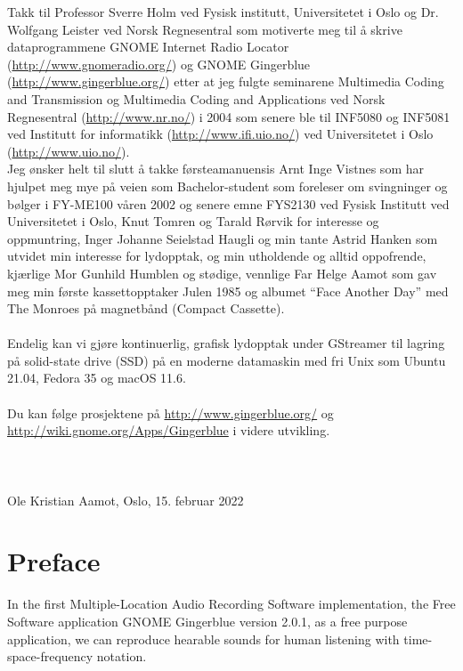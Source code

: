 \documentclass[UKenglish]{ifimaster}  %
\begin{document}
Takk til Professor Sverre Holm ved Fysisk institutt, Universitetet i
Oslo og Dr. Wolfgang Leister ved Norsk Regnesentral som motiverte meg
til å skrive dataprogrammene GNOME Internet Radio Locator
(\url{http://www.gnomeradio.org/}) og GNOME Gingerblue
(\url{http://www.gingerblue.org/}) etter at jeg fulgte seminarene
Multimedia Coding and Transmission og Multimedia Coding and
Applications ved Norsk Regnesentral (\url{http://www.nr.no/}) i 2004
som senere ble til INF5080 og INF5081 ved Institutt for informatikk (\url{http://www.ifi.uio.no/}) ved Universitetet i Oslo (\url{http://www.uio.no/}).\\

Jeg ønsker helt til slutt å takke førsteamanuensis Arnt Inge Vistnes
som har hjulpet meg mye på veien som Bachelor-student som foreleser om
svingninger og bølger i FY-ME100 våren 2002 og senere emne FYS2130 ved
Fysisk Institutt ved Universitetet i Oslo, Knut Tomren og Tarald
Rørvik for interesse og oppmuntring, Inger Johanne Seielstad Haugli og
min tante Astrid Hanken som utvidet min interesse for lydopptak, og
min utholdende og alltid oppofrende, kjærlige Mor Gunhild Humblen og
stødige, vennlige Far Helge Aamot som gav meg min første
kassettopptaker Julen 1985 og albumet ``Face Another Day'' med The
Monroes på magnetbånd (Compact Cassette).\\\\

Endelig kan vi gjøre kontinuerlig, grafisk lydopptak under GStreamer til
lagring på solid-state drive (SSD) på en moderne datamaskin med fri Unix
som Ubuntu 21.04, Fedora 35 og macOS 11.6.\\\\

Du kan følge prosjektene på \url{http://www.gingerblue.org/} og
\url{http://wiki.gnome.org/Apps/Gingerblue} i videre utvikling.\\\\\\\\

\noindent Ole Kristian Aamot, Oslo, 15. februar 2022

\chapter*{Preface}                    %

In the first Multiple-Location Audio Recording Software
implementation, the Free Software application GNOME Gingerblue version
2.0.1, as a free purpose application, we can reproduce hearable sounds
for human listening with time-space-frequency notation.
\end{document}
